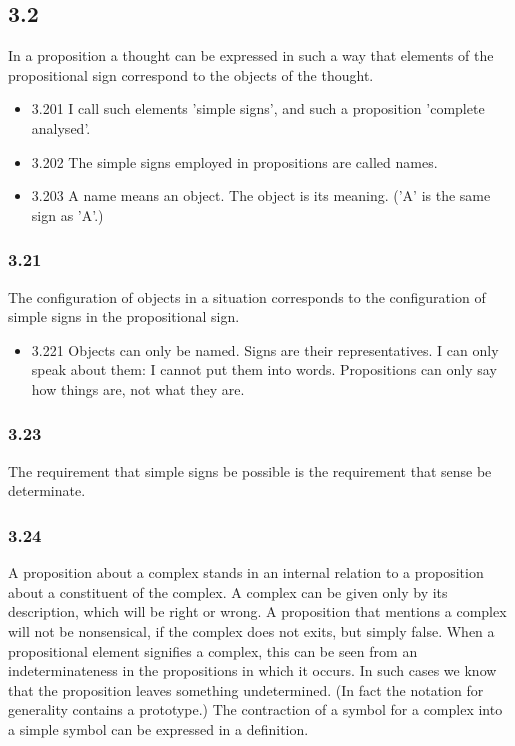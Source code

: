 \documentclass[11pt]{article}
\begin{document}
\subsection*{3.2}
\label{sec:orgb485885}
In a proposition a thought can be expressed in such a way that elements
of the propositional sign correspond to the objects of the thought.
\begin{itemize}
\item 3.201
\label{sec:org9088682}
I call such elements 'simple signs', and such a proposition 'complete
analysed'.
\item 3.202
\label{sec:orgff304d6}
The simple signs employed in propositions are called names.
\item 3.203
\label{sec:orgb415785}
A name means an object. The object is its meaning. ('A' is the same
sign as 'A'.)
\end{itemize}
\subsubsection*{3.21}
\label{sec:org70a15c0}
The configuration of objects in a situation corresponds to the
configuration of simple signs in the propositional sign.
\begin{itemize}
\item 3.221
\label{sec:orge92ccdc}
Objects can only be named. Signs are their representatives. I can
only speak about them: I cannot put them into words. Propositions can only
say how things are, not what they are.
\end{itemize}
\subsubsection*{3.23}
\label{sec:orgde1beb6}
The requirement that simple signs be possible is the requirement that
sense be determinate.
\subsubsection*{3.24}
\label{sec:orgbf120e6}
A proposition about a complex stands in an internal relation to a
proposition about a constituent of the complex. A complex can be given only
by its description, which will be right or wrong. A proposition that
mentions a complex will not be nonsensical, if the complex does not exits,
but simply false. When a propositional element signifies a complex, this
can be seen from an indeterminateness in the propositions in which it
occurs. In such cases we know that the proposition leaves something
undetermined. (In fact the notation for generality contains a prototype.)
The contraction of a symbol for a complex into a simple symbol can be
expressed in a definition.
\end{document}
